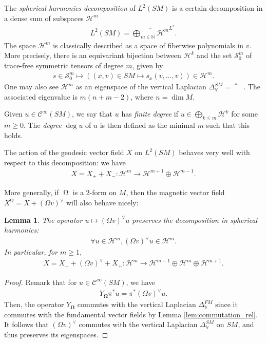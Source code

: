 \documentclass[12pt]{amsart}
\numberwithin{numbering}{section}
\theoremstyle{plain}
\newtheorem{lem}[numbering]{Lemma}
\theoremstyle{definition}
\theoremstyle{remark}
\numberwithin{equation}{section}
\DeclareMathOperator{\nv}{\nabla_{\mathbb{V}}}
\DeclareMathOperator{\oo}{\mathbf{\Omega}}
\DeclareMathOperator{\mg}{\Omega}
\newcommand{\N}{\mathbb{N}}
\begin{document}
The \emph{spherical harmonics decomposition} of $L^2(SM)$ is a certain decomposition in a dense sum of subspaces $\mathcal{H}^m$
\begin{align*}
L^2(SM) = \overline{\bigoplus_{m \in \N} \mathcal{H}^m}^{L^2}.
\end{align*}
The space $\mathcal{H}^m$ is classically described as a space of fiberwise polynomials in $v$. More precisely, there is an equivariant bijection between $\mathcal{H}^k$ and the set $\mathcal{S}^m_0$ of trace-free symmetric tensors of degree $m$, given by 
\begin{align*}
s \in \mathcal{S}^m_0 \mapsto \left ( (x, v) \in SM \mapsto s_x(v, \ldots, v) \right ) \in \mathcal{H}^m.
\end{align*}
One may also see $\mathcal{H}^m$ as an eigenspace of the vertical Laplacian $\Delta_{\mathbb{V}}^{SM} = \nv^* \nv$. The associated eigenvalue is $m(n+m-2)$, where $n = \dim M$.

Given $u \in \mathcal{C}^\infty(SM)$, we say that $u$ has \emph{finite degree} if $u \in \bigoplus_{k \leq m} \mathcal{H}^k$ for some $m \geq 0$. The \emph{degree} $\deg u$ of $u$ is then defined as the minimal $m$ such that this holds.

\medskip 

The action of the geodesic vector field $X$ on $L^2(SM)$ behaves very well with respect to this decomposition: we have 
\begin{align*}
X = X_+ + X_- : \mathcal{H}^m \to \mathcal{H}^{m+1} \oplus \mathcal{H}^{m-1}.
\end{align*}

More generally, if $\mg$ is a $2$-form on $M$, then the magnetic vector field $X^{\mg} = X + (\Omega v)^\vee$ will also behave nicely:
\begin{lem}
The operator $u \mapsto (\Omega v)^\vee u$ preserves the decomposition in spherical harmonics:
\begin{align*}
\forall u \in \mathcal{H}^m, (\Omega v)^\vee u \in \mathcal{H}^m.
\end{align*}
In particular, for $m \geq 1$, 
\begin{align*}
X = X_- + (\Omega v)^\vee + X_+ : \mathcal{H}^m \to \mathcal{H}^{m-1} \oplus \mathcal{H}^m \oplus \mathcal{H}^{m+1}.
\end{align*}
\end{lem}
\begin{proof}
Remark that for $u \in \mathcal{C}^\infty(SM)$, we have 
\begin{align*}
Y_{\oo} \pi^* u = \pi^* (\Omega v)^\vee u.
\end{align*}
Then, the operator $Y_{\oo}$ commutes with the vertical Laplacian $\Delta_{\mathbb{V}}^{FM}$ since it commutes with the fundamental vector fields by Lemma \ref{lem:commutation_rel}. It follows that $(\Omega v)^\vee$ commutes with the vertical Laplacian $\Delta_{\mathbb{V}}^{SM}$ on $SM$, and thus preserves its eigenspaces.
\end{proof}
\end{document}

